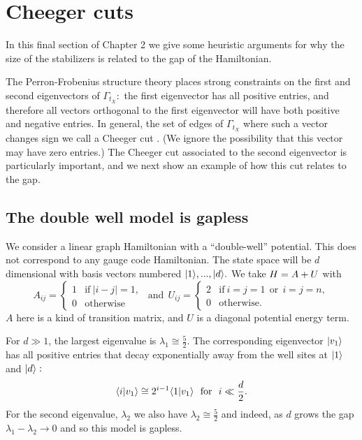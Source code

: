 \section{Cheeger cuts}

In this final section of Chapter 2 
we give some heuristic
arguments for why the size of the stabilizers is
related to the gap of the Hamiltonian. 

The Perron-Frobenius structure theory places
strong constraints on the first and second
eigenvectors of $\Gamma_{t_X}:$
the first eigenvector has all positive entries,
and therefore all vectors orthogonal to the first
eigenvector will have both positive and negative entries.
In general, the set of edges of $\Gamma_{t_X}$ where
such a vector changes sign we call a Cheeger cut 
\cite{Cheeger1970,Chung1997}.
(We ignore the possibility that this vector
may have zero entries.)
The Cheeger cut associated to the second eigenvector
is particularly important, and we next show an
example of how this cut relates to the gap.

\subsection{The double well model is gapless}

We consider a linear graph Hamiltonian
with a ``double-well'' potential.
This does not correspond to any gauge code Hamiltonian.
The state space will be $d$ dimensional with
basis vectors numbered $|{1}\rangle,...,|{d}\rangle.$
We take
$ H = A + U $
with
$$
A_{ij} = \left\{ \begin{array}{ll}
     1 &\mbox{if}\  |i-j|=1,  \\
     0 &\mbox{otherwise}\end{array}\right.
\ \ \mbox{and}\ \ 
U_{ij} =  \left\{ \begin{array}{ll}
     2 &\mbox{if}\  i=j=1 \ \ \mbox{or}\ \  i=j=n, \\
     0 &\mbox{otherwise.}\end{array}\right.
$$
$A$ here is a kind of transition matrix,
and $U$ is a diagonal potential energy term.

For $d\gg 1$, the largest
eigenvalue is $\lambda_1 \cong \frac{5}{2}$.
The corresponding eigenvector $|{v_1}\rangle$
has all positive entries that
decay exponentially away from the well sites
at $|{1}\rangle$ and $|{d}\rangle:$
$$
    \langle{i}|{v_1}\rangle 
    \cong 2^{i-1} \langle{1}|{v_1}\rangle
    \ \ \mbox{for}\ \ i\ll \frac{d}{2}.
$$
For the second eigenvalue, $\lambda_2$
we also have  $\lambda_2 \cong \frac{5}{2}$
and indeed, as $d$ grows
the gap $\lambda_1 - \lambda_2 \rightarrow 0$
and so this model is gapless.

